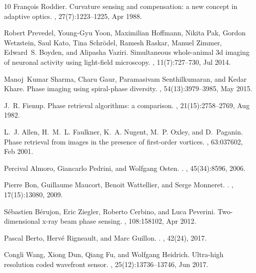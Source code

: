 \documentclass[10pt,twocolumn,twoside,letterpaper]{article}
\begin{document}
\begin{thebibliography}{10}
Fran\c{c}ois Roddier.
\newblock Curvature sensing and compensation: a new concept in adaptive optics.
, 27(7):1223--1225, Apr 1988.

Robert Prevedel, Young-Gyu Yoon, Maximilian Hoffmann, Nikita Pak, Gordon
  Wetzstein, Saul Kato, Tina Schr{\"o}del, Ramesh Raskar, Manuel Zimmer,
  Edward~S. Boyden, and Alipasha Vaziri.
\newblock Simultaneous whole-animal 3d imaging of neuronal activity using
  light-field microscopy.
, 11(7):727--730, Jul 2014.

Manoj~Kumar Sharma, Charu Gaur, Paramasivam Senthilkumaran, and Kedar Khare.
\newblock Phase imaging using spiral-phase diversity.
, 54(13):3979--3985, May 2015.

J.~R. Fienup.
\newblock Phase retrieval algorithms: a comparison.
, 21(15):2758--2769, Aug 1982.

L.~J. Allen, H.~M.~L. Faulkner, K.~A. Nugent, M.~P. Oxley, and D.~Paganin.
\newblock Phase retrieval from images in the presence of first-order vortices.
, 63:037602, Feb 2001.

Percival Almoro, Giancarlo Pedrini, and Wolfgang Osten.
.
, 45(34):8596, 2006.

Pierre Bon, Guillaume Maucort, Benoit Wattellier, and Serge Monneret.
.
, 17(15):13080, 2009.

S\'ebastien B\'erujon, Eric Ziegler, Roberto Cerbino, and Luca Peverini.
\newblock Two-dimensional x-ray beam phase sensing.
, 108:158102, Apr 2012.

Pascal Berto, Herv\'e Rigneault, and Marc Guillon.
.
, 42(24), 2017.

Congli Wang, Xiong Dun, Qiang Fu, and Wolfgang Heidrich.
\newblock Ultra-high resolution coded wavefront sensor.
, 25(12):13736--13746, Jun 2017.


\end{thebibliography}
\end{document}
